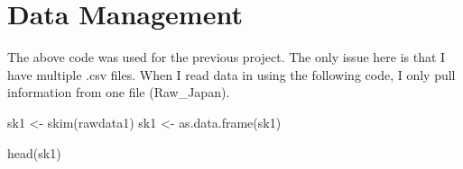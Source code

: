 \documentclass[
  letterpaper,
  DIV=11,
  numbers=noendperiod]{scrartcl}
\newenvironment{Shaded}{\begin{snugshade}}{\end{snugshade}}
\newcommand{\AttributeTok}[1]{\textcolor[rgb]{0.40,0.45,0.13}{#1}}
\newcommand{\CommentTok}[1]{\textcolor[rgb]{0.37,0.37,0.37}{#1}}
\newcommand{\ConstantTok}[1]{\textcolor[rgb]{0.56,0.35,0.01}{#1}}
\newcommand{\FunctionTok}[1]{\textcolor[rgb]{0.28,0.35,0.67}{#1}}
\newcommand{\NormalTok}[1]{\textcolor[rgb]{0.00,0.23,0.31}{#1}}
\newcommand{\OtherTok}[1]{\textcolor[rgb]{0.00,0.23,0.31}{#1}}
\newcommand{\SpecialCharTok}[1]{\textcolor[rgb]{0.37,0.37,0.37}{#1}}
\newcommand{\StringTok}[1]{\textcolor[rgb]{0.13,0.47,0.30}{#1}}
\begin{document}
\begin{Shaded}
\end{Shaded}

\hypertarget{data-management}{%
\section{Data Management}\label{data-management}}

The above code was used for the previous project. The only issue here is
that I have multiple .csv files. When I read data in using the following
code, I only pull information from one file (Raw\_Japan).

\begin{Shaded}
\begin{Highlighting}[]
\NormalTok{sk1 }\OtherTok{\textless{}{-}} \FunctionTok{skim}\NormalTok{(rawdata1)}
\NormalTok{sk1 }\OtherTok{\textless{}{-}} \FunctionTok{as.data.frame}\NormalTok{(sk1)}

\FunctionTok{head}\NormalTok{(sk1)}
\end{Highlighting}
\end{Shaded}
\end{document}
